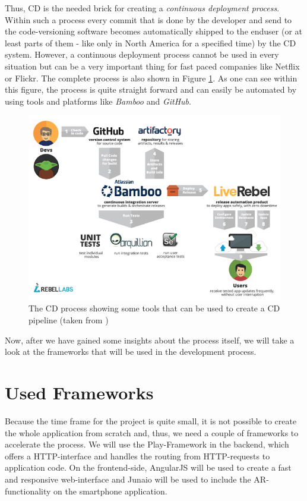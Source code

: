 Thus, \ac{CD} is the needed brick for creating a \emph{continuous deployment process}. Within such a process every commit that is done by the developer and send to the code-versioning software becomes automatically shipped to the enduser (or at least parts of them - like only in North America for a specified time) by the \ac{CD} system. However, a continuous deployment process cannot be used in every situation but can be a very important thing for fast paced companies like Netflix or Flickr. The complete process is also shown in Figure \ref{hip:cd}. As one can see within this figure, the process is quite straight forward and can easily be automated by using tools and platforms like \emph{Bamboo} and \emph{GitHub}.

\begin{figure}[th]
\centerline{\includegraphics[width=1\textwidth]{gfx/continuous-delivery}}
\caption{The \ac{CD} process showing some tools that can be used to create a \ac{CD} pipeline (taken from \cite{Wattson:2013aa})}
\label{hip:cd}
\end{figure}

Now, after we have gained some insights about the process itself, we will take a look at the frameworks that will be used in the development process.

\section{Used Frameworks}
Because the time frame for the project is quite small, it is not possible to create the whole application from scratch and, thus, we need a couple of frameworks to accelerate the process. We will use the Play-Framework in the backend, which offers a \ac{HTTP}-interface and handles the routing from \ac{HTTP}-requests to application code. On the frontend-side, AngularJS will be used to create a fast and responsive web-interface and Junaio will be used to include the \ac{AR}-functionality on the smartphone application.

